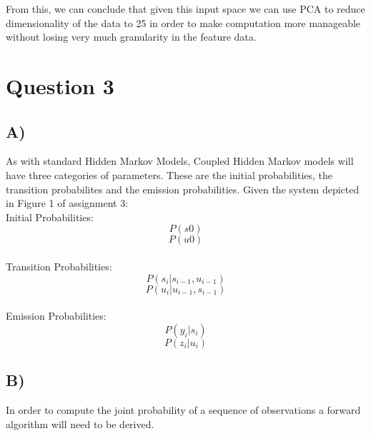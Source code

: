 \documentclass{report}
\begin{document}
From this, we can conclude that given this input space we can use PCA to
reduce dimensionality of the data to 25 in order to make computation more manageable
without losing very much granularity in the feature data.
\section*{Question 3}
\subsection*{A)}
As with standard Hidden Markov Models, Coupled Hidden Markov models will
have three categories of parameters. These are the initial probabilities, the
transition probabilites and the emission probabilities. Given the system
depicted in Figure 1 of assignment 3:\\

Initial Probabilities:
\begin{equation}
  P(s0)
\end{equation}
\begin{equation}
  P(u0)
\end{equation}\\

Transition Probabilities:
\begin{equation}
  P(s_i | s_{i-1}, u_{i-1})
\end{equation}
\begin{equation}
  P(u_i | u_{i-1}, s_{i-1})
\end{equation}\\

Emission Probabilities:
\begin{equation}
  P(y_i | s_i)
\end{equation}
\begin{equation}
  P(z_i | u_i)
\end{equation}

\subsection*{B)}
In order to compute the joint probability of a sequence of observations a
forward algorithm will need to be derived.
\end{document}
